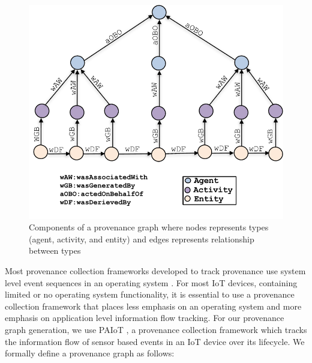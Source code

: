 \begin{figure}[h!]
\begin{center}
\includegraphics[width=\columnwidth]{picture13.pdf}
\end{center}
\caption{Components of a provenance graph where nodes represents types (agent, activity, and entity) and edges represents relationship between types}
\label{Provenance_Sensor}
\end{figure}


Most provenance collection frameworks developed to track provenance use system level event sequences in an operating system \cite{pasquier-socc2017,acsac,Muniswamy-Reddy}. For most IoT devices, containing limited or no operating system functionality, it is essential to use a provenance collection framework that places less emphasis on an operating system and more emphasis on application level information flow tracking. For our provenance graph generation, we use PAIoT \cite{paiot}, a provenance collection framework which tracks the information flow of sensor based events in an IoT device over its lifecycle. We formally define a provenance graph as follows: 


%

